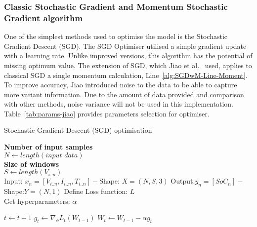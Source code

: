 \subsubsection{Classic Stochastic Gradient and Momentum Stochastic Gradient algorithm}
One of the simplest methods used to optimise the model is the Stochastic Gradient Descent (SGD).
The SGD Optimiser utilised a simple gradient update with a learning rate.
Unlike improved versions, this algorithm has the potential of missing optimum value. The extension of SGD, which Jiao et al.~\cite{jiao_gru-rnn_2020} used, applies to classical SGD a single momentum calculation, Line~\ref{alg:SGDwM-Line-Moment}.
To improve accuracy, Jiao introduced noise to the data to be able to capture more variant information.
Due to the amount of data provided and comparison with other methods, noise variance will not be used in this implementation.
Table~\ref{tab:params-jiao} provides parameters selection for optimiser.
\vspace{1pt}
\hspace{-3pt}
\begin{algorithm}
  \caption{Stochastic Gradient Descent (SGD) optimisation}
  \begin{algorithmic}[1]
    \STATE \textbf{Number of input samples} \\ $N\gets length(\textit{input data})$\\
    \STATE \textbf{Size of windows} \\ $S\gets length(V_{i..n})$\\
    \STATE Input: $x_n = [V_{i..n}, I_{i..n}, T_{i..n}] - $Shape: $X = (N, S, 3)$
    \STATE Output:$y_n = [SoC_{n}] - $Shape:$Y = (N, 1)$
    \STATE Define Loss function: $L$ \\
           Get hyperparameters: $\alpha$
    
    \STATE $t \gets t+1$
    \STATE $g_t \gets \nabla_\phi L_t (W_{t-1})$ 
    \STATE $W_t \gets W_{t-1} - \alpha g_t $ 
    \ENDWHILE
  \end{algorithmic}
  \label{alg:SGD}
\end{algorithm}

